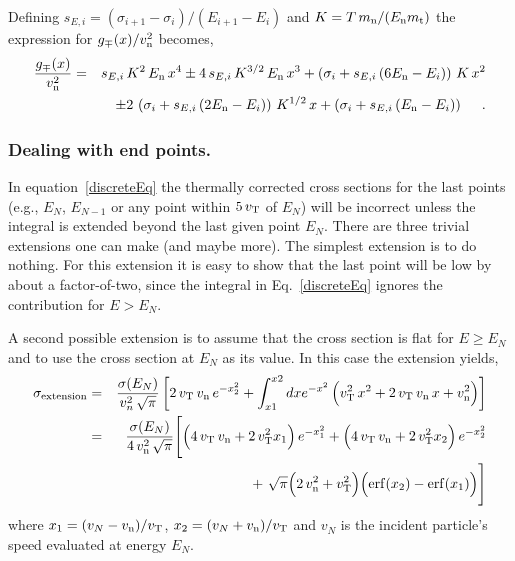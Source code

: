 \documentclass[11pt,twoside]{article}
\begin{document}
Defining $s_{E,i} = ( \sigma_{i+1} - \sigma_i ) / ( E_{i+1} - E_i )$ and $K = T \, m_{\rm n} / ( E_{\rm n} m_{\rm t} )$
the expression for $g_\mp(x) / v_{\rm n}^2$ becomes,
\begin{eqnarray}
    { g_\mp(x) \over v_{\rm n}^2 } & = & s_{E,i} \, K^2 \, E_{\rm n} \, x^4 \pm 4 \, s_{E,i} \, K^{3/2} \, E_{\rm n} \, x^3 +
    \left( \sigma_i + s_{E,i} \, ( 6 E_{\rm n} - E_i ) \right) \, K \, x^2 \nonumber \\
    & & \pm 2 \, \left( \sigma_i + s_{E,i} \, ( 2 E_{\rm n} - E_i ) \right) \, K^{1/2} \, x +
    \left( \sigma_i + s_{E,i} \, ( E_{\rm n} - E_i ) \right) \ \ \ \ .
\end{eqnarray}

\subsubsection{Dealing with end points.} \label{EndPoints}
In equation~\ref{discreteEq} the thermally corrected cross sections for the last points (e.g., $E_N$, $E_{N-1}$
or any point within $5 \, v_{\rm T}$ of $E_N$)
will be incorrect unless the integral is extended beyond the last given point $E_N$. There are three trivial
extensions one can make (and maybe more). The simplest extension is to do nothing. 
For this extension it is easy to show that the last point will be low by about a factor-of-two, since the
integral in Eq.~\ref{discreteEq} ignores the contribution for $E > E_N$. 

A second possible extension is to assume that the cross section is flat for $E \ge E_N$ and to use
the cross section at $E_N$ as its value. In this case the extension yields,
\begin{eqnarray}
	\sigma_{\rm extension} & = & { \sigma(E_N) \over v_n^2 \, \sqrt{\pi} }
            \left[ 2 \, v_{\rm T} \, v_{\rm n} \, e^{-x_2^2} +
            \int_{x1}^{x2} dx e^{-x^2} \, \Big( v_{\rm T}^2 \, x^2 + 2 \, v_{\rm T} \, v_{\rm n} \, x + v_{\rm n}^2 \Big) \right] \nonumber \\
        & = & { \sigma(E_N) \over 4 \, v_{\rm n}^2 \, \sqrt{\pi} } 
		    \Bigg[ \Big( 4 \, v_{\rm T} \, v_{\rm n} + 2 \, v_{\rm T}^2 x_1 \Big) \, e^{-x_1^2} + 
            \Big( 4 \, v_{\rm T} \, v_{\rm n} + 2 \, v_{\rm T}^2 x_2 \Big) \, e^{-x_2^2} \nonumber \\
        & & + \ \sqrt{\pi} \Big( 2 \, v_{\rm n}^2 + v_{\rm T}^2 \Big) \Big( {\rm erf}(x_2) - {\rm erf}(x_1) \Big) \Bigg]
\end{eqnarray}
where $x_1 = ( v_N - v_{\rm n} ) / v_{\rm T}$, $x_2 = ( v_N + v_{\rm n} ) / v_{\rm T}$ and $v_N$ 
is the incident particle's speed evaluated at energy $E_N$.
\end{document}
